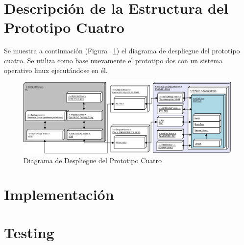 		\newpage
		
		\section{Descripción de la Estructura del Prototipo Cuatro}
		Se muestra a continuación (Figura ~\ref{fig:proto4}) el diagrama de despliegue del prototipo cuatro. Se utiliza como base nuevamente el prototipo
		dos con un sistema operativo linux ejecutándose en él.

		\begin{figure}[h!]
 		\begin{center}
  		\includegraphics[width=1\textwidth,keepaspectratio=true]{./images/proto4}
  		\caption{Diagrama de Despliegue del Prototipo Cuatro}
  		\label{fig:proto4} 
 		\end{center}
		\end{figure}
	
		\newpage

		\section{Implementación}	
		
		\section{Testing}
		
